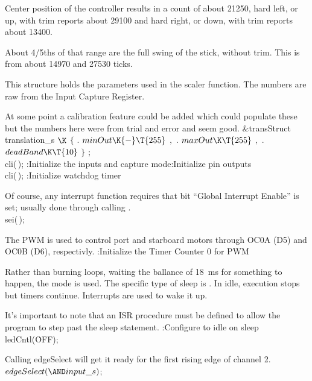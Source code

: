 Center position of the controller results in a count of  about 21250,
hard left, or up, with trim reports about 29100 and hard right, or down,
with trim reports about 13400.

About 4/5ths of that range are the full swing of the stick, without trim.
This is from about 14970 and 27530 ticks.

This  structure holds the parameters used in the scaler
function.
The  numbers are raw from the Input Capture Register.

At some point a calibration feature could be added which could populate these
but the numbers here were from trial and error and seem good.
\Y\B\&{transStruct} \\{translation\_s} $\K$ $\{$ $.$ $\\{minOut}\K{-}\T{255}$
$,$ $.$ $\\{maxOut}\K\T{255}$ $,$ $.$ $\\{deadBand}\K\T{10}$ $\}$  ;\6
\\{cli}(\,);\7
:Initialize the inputs and capture mode\X{}:Initialize pin outputs\X%
\\{cli}(\,);\6
:Initialize watchdog timer\X\Y\par
\fi

Of course, any interrupt function requires that bit ``Global Interrupt Enable''
is set; usually done through calling .
\Y\B\\{sei}(\,);\Y\par
\fi


The PWM is used to control port and starboard motors through OC0A (D5) and
OC0B (D6), respectivly.
\Y\B{}:Initialize the Timer Counter 0 for PWM\X\par
\fi

Rather than burning loops, waiting the ballance of 18~ms for something to
happen, the  mode is used.
The specific type of sleep is .
In idle, execution stops but timers continue.
Interrupts are used to wake it up.

It's important to note that an ISR procedure must be defined to allow the
program to step past the sleep statement.
\Y\B{}:Configure to idle on sleep\X\7
\\{ledCntl}(\.{OFF});\par
\fi

Calling edgeSelect will get it ready for the first rising edge of channel 2.
\Y\B$\\{edgeSelect}({\AND}\\{input\_s}){}$;\par
\fi


